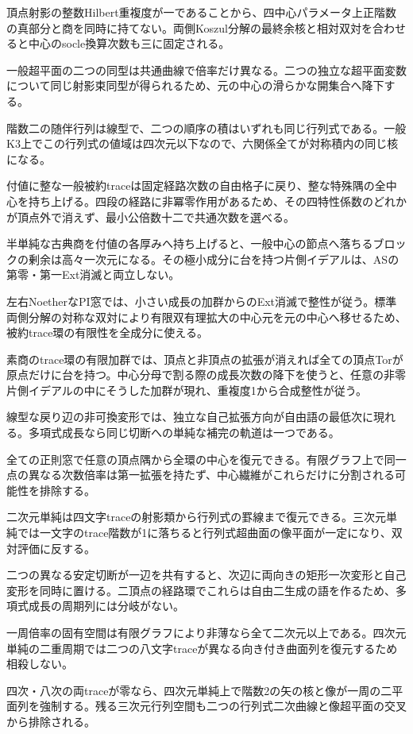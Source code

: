 \documentclass[11pt,a4paper]{ltjsarticle}
\begin{document}
頂点射影の整数Hilbert重複度が一であることから、四中心パラメータ上正階数の真部分と商を同時に持てない。両側Koszul分解の最終余核と相対双対を合わせると中心のsocle換算次数も三に固定される。

一般超平面の二つの同型は共通曲線で倍率だけ異なる。二つの独立な超平面変数について同じ射影束同型が得られるため、元の中心の滑らかな開集合へ降下する。

階数二の随伴行列は線型で、二つの順序の積はいずれも同じ行列式である。一般K3上でこの行列式の値域は四次元以下なので、六関係全てが対称積内の同じ核になる。

付値に整な一般被約traceは固定経路次数の自由格子に戻り、整な特殊隅の全中心を持ち上げる。四段の経路に非冪零作用があるため、その四特性係数のどれかが頂点外で消えず、最小公倍数十二で共通次数を選べる。

半単純な古典商を付値の各厚みへ持ち上げると、一般中心の節点へ落ちるブロックの剰余は高々一次元になる。その極小成分に台を持つ片側イデアルは、ASの第零・第一Ext消滅と両立しない。

左右NoetherなPI窓では、小さい成長の加群からのExt消滅で整性が従う。標準両側分解の対称な双対により有限双有理拡大の中心元を元の中心へ移せるため、被約trace環の有限性を全成分に使える。

素商のtrace環の有限加群では、頂点と非頂点の拡張が消えれば全ての頂点Torが原点だけに台を持つ。中心分母で割る際の成長次数の降下を使うと、任意の非零片側イデアルの中にそうした加群が現れ、重複度1から合成整性が従う。

線型な戻り辺の非可換変形では、独立な自己拡張方向が自由語の最低次に現れる。多項式成長なら同じ切断への単純な補完の軌道は一つである。

全ての正則窓で任意の頂点隅から全環の中心を復元できる。有限グラフ上で同一点の異なる次数倍率は第一拡張を持たず、中心繊維がこれらだけに分割される可能性を排除する。

二次元単純は四文字traceの射影類から行列式の罫線まで復元できる。三次元単純では一文字のtrace階数が1に落ちると行列式超曲面の像平面が一定になり、双対評価に反する。

二つの異なる安定切断が一辺を共有すると、次辺に両向きの矩形一次変形と自己変形を同時に置ける。二頂点の経路環でこれらは自由二生成の語を作るため、多項式成長の周期列には分岐がない。

一周倍率の固有空間は有限グラフにより非薄なら全て二次元以上である。四次元単純の二重周期では二つの八文字traceが異なる向き付き曲面列を復元するため相殺しない。

四次・八次の両traceが零なら、四次元単純上で階数2の矢の核と像が一周の二平面列を強制する。残る三次元行列空間も二つの行列式二次曲線と像超平面の交叉から排除される。
\end{document}
